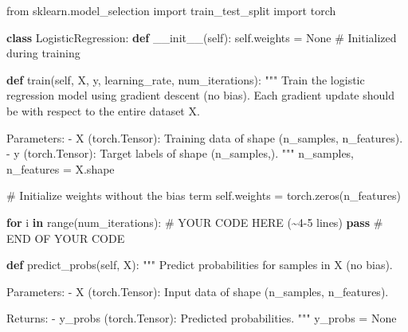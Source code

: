 \documentclass[
  letterpaper,
  numbers=noenddot,
  DIV=11]{scrreprt}
\newenvironment{Shaded}{\begin{snugshade}}{\end{snugshade}}
\newcommand{\BuiltInTok}[1]{\textcolor[rgb]{0.00,0.23,0.31}{#1}}
\newcommand{\CommentTok}[1]{\textcolor[rgb]{0.37,0.37,0.37}{#1}}
\newcommand{\ControlFlowTok}[1]{\textcolor[rgb]{0.00,0.23,0.31}{\textbf{#1}}}
\newcommand{\FunctionTok}[1]{\textcolor[rgb]{0.28,0.35,0.67}{#1}}
\newcommand{\ImportTok}[1]{\textcolor[rgb]{0.00,0.46,0.62}{#1}}
\newcommand{\KeywordTok}[1]{\textcolor[rgb]{0.00,0.23,0.31}{\textbf{#1}}}
\newcommand{\NormalTok}[1]{\textcolor[rgb]{0.00,0.23,0.31}{#1}}
\newcommand{\OperatorTok}[1]{\textcolor[rgb]{0.37,0.37,0.37}{#1}}
\newcommand{\RegionMarkerTok}[1]{\textcolor[rgb]{0.00,0.23,0.31}{#1}}
\newcommand{\VariableTok}[1]{\textcolor[rgb]{0.07,0.07,0.07}{#1}}
\theoremstyle{definition}
\theoremstyle{plain}
\theoremstyle{plain}
\theoremstyle{remark}
\begin{document}
\begin{tcolorbox}[colframe=.grey, title=\faCode \enspace Code]

\begin{Shaded}
\begin{Highlighting}[numbers=left,,]
\ImportTok{from}\NormalTok{ sklearn.model\_selection }\ImportTok{import}\NormalTok{ train\_test\_split}
\ImportTok{import}\NormalTok{ torch}

\KeywordTok{class}\NormalTok{ LogisticRegression:}
    \KeywordTok{def} \FunctionTok{\_\_init\_\_}\NormalTok{(}\VariableTok{self}\NormalTok{):}
        \VariableTok{self}\NormalTok{.weights }\OperatorTok{=} \VariableTok{None}  \CommentTok{\# Initialized during training}

    \KeywordTok{def}\NormalTok{ train(}\VariableTok{self}\NormalTok{, X, y, learning\_rate, num\_iterations):}
        \CommentTok{"""}
\CommentTok{        Train the logistic regression model using gradient descent (no bias).}
\CommentTok{        Each gradient update should be with respect to the entire dataset X.}

\CommentTok{        Parameters:}
\CommentTok{        {-} X (torch.Tensor): Training data of shape (n\_samples, n\_features).}
\CommentTok{        {-} y (torch.Tensor): Target labels of shape (n\_samples,).}
\CommentTok{        """}
\NormalTok{        n\_samples, n\_features }\OperatorTok{=}\NormalTok{ X.shape}

        \CommentTok{\# Initialize weights without the bias term}
        \VariableTok{self}\NormalTok{.weights }\OperatorTok{=}\NormalTok{ torch.zeros(n\_features)}

        \ControlFlowTok{for}\NormalTok{ i }\KeywordTok{in} \BuiltInTok{range}\NormalTok{(num\_iterations):}
            \CommentTok{\# YOUR CODE HERE (\textasciitilde{}4{-}5 lines)}
                \ControlFlowTok{pass}
            \CommentTok{\# }\RegionMarkerTok{END}\CommentTok{ OF YOUR CODE}

    \KeywordTok{def}\NormalTok{ predict\_probs(}\VariableTok{self}\NormalTok{, X):}
        \CommentTok{"""}
\CommentTok{        Predict probabilities for samples in X (no bias).}

\CommentTok{        Parameters:}
\CommentTok{        {-} X (torch.Tensor): Input data of shape (n\_samples, n\_features).}

\CommentTok{        Returns:}
\CommentTok{        {-} y\_probs (torch.Tensor): Predicted probabilities.}
\CommentTok{        """}
\NormalTok{        y\_probs }\OperatorTok{=} \VariableTok{None}


\end{Highlighting}
\end{Shaded}
\end{tcolorbox}
\end{document}
